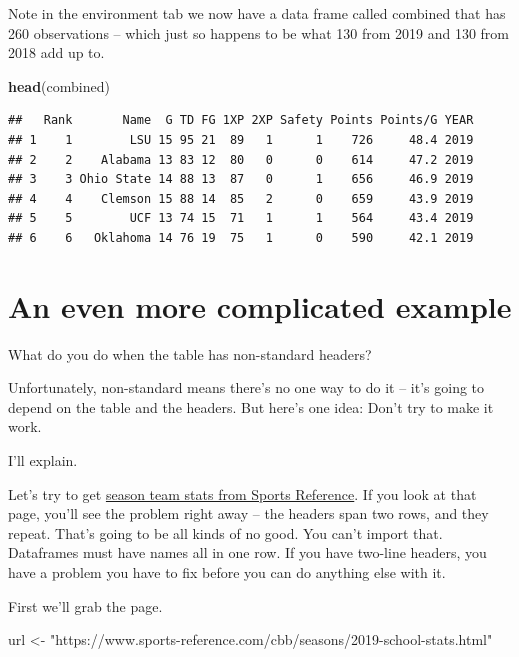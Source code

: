 \documentclass[
]{book}
\newenvironment{Shaded}{\begin{snugshade}}{\end{snugshade}}
\newcommand{\KeywordTok}[1]{\textcolor[rgb]{0.13,0.29,0.53}{\textbf{#1}}}
\newcommand{\NormalTok}[1]{#1}
\newcommand{\StringTok}[1]{\textcolor[rgb]{0.31,0.60,0.02}{#1}}
\begin{document}
Note in the environment tab we now have a data frame called combined that has 260 observations -- which just so happens to be what 130 from 2019 and 130 from 2018 add up to.

\begin{Shaded}
\begin{Highlighting}[]
\KeywordTok{head}\NormalTok{(combined)}
\end{Highlighting}
\end{Shaded}

\begin{verbatim}
##   Rank       Name  G TD FG 1XP 2XP Safety Points Points/G YEAR
## 1    1        LSU 15 95 21  89   1      1    726     48.4 2019
## 2    2    Alabama 13 83 12  80   0      0    614     47.2 2019
## 3    3 Ohio State 14 88 13  87   0      1    656     46.9 2019
## 4    4    Clemson 15 88 14  85   2      0    659     43.9 2019
## 5    5        UCF 13 74 15  71   1      1    564     43.4 2019
## 6    6   Oklahoma 14 76 19  75   1      0    590     42.1 2019
\end{verbatim}

\hypertarget{an-even-more-complicated-example}{%
\section{An even more complicated example}\label{an-even-more-complicated-example}}

What do you do when the table has non-standard headers?

Unfortunately, non-standard means there's no one way to do it -- it's going to depend on the table and the headers. But here's one idea: Don't try to make it work.

I'll explain.

Let's try to get \href{https://www.sports-reference.com/cbb/seasons/2019-school-stats.html}{season team stats from Sports Reference}. If you look at that page, you'll see the problem right away -- the headers span two rows, and they repeat. That's going to be all kinds of no good. You can't import that. Dataframes must have names all in one row. If you have two-line headers, you have a problem you have to fix before you can do anything else with it.

First we'll grab the page.

\begin{Shaded}
\begin{Highlighting}[]
\NormalTok{url <-}\StringTok{ "https://www.sports-reference.com/cbb/seasons/2019-school-stats.html"}
\end{Highlighting}
\end{Shaded}
\end{document}
